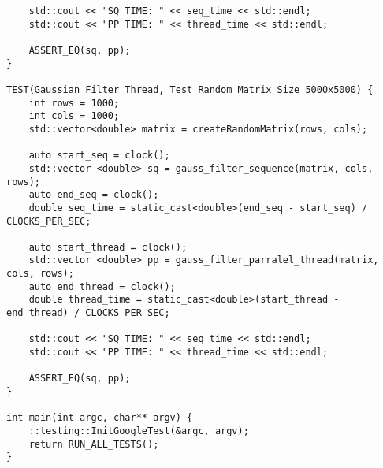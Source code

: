 \documentclass{report}
\begin{document}
\begin{lstlisting}
    std::cout << "SQ TIME: " << seq_time << std::endl;
    std::cout << "PP TIME: " << thread_time << std::endl;

    ASSERT_EQ(sq, pp);
}

TEST(Gaussian_Filter_Thread, Test_Random_Matrix_Size_5000x5000) {
    int rows = 1000;
    int cols = 1000;
    std::vector<double> matrix = createRandomMatrix(rows, cols);

    auto start_seq = clock();
    std::vector <double> sq = gauss_filter_sequence(matrix, cols, rows);
    auto end_seq = clock();
    double seq_time = static_cast<double>(end_seq - start_seq) / CLOCKS_PER_SEC;

    auto start_thread = clock();
    std::vector <double> pp = gauss_filter_parralel_thread(matrix, cols, rows);
    auto end_thread = clock();
    double thread_time = static_cast<double>(start_thread - end_thread) / CLOCKS_PER_SEC;

    std::cout << "SQ TIME: " << seq_time << std::endl;
    std::cout << "PP TIME: " << thread_time << std::endl;

    ASSERT_EQ(sq, pp);
}

int main(int argc, char** argv) {
    ::testing::InitGoogleTest(&argc, argv);
    return RUN_ALL_TESTS();
}

\end{lstlisting}
\end{document}
